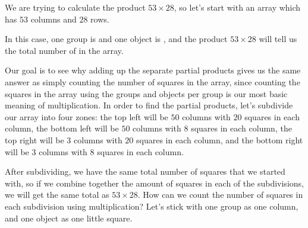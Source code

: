 \documentclass{ximera}
\begin{document}
\begin{explanation}
We are trying to calculate the product $53 \times 28$, so let's start with an array which has $53$ columns and $28$ rows.

\begin{image}
\end{image}
In this case, one group is  and one object is  , and the product $53 \times 28$ will tell us the total number of  in the array.

Our goal is to see why adding up the separate partial products gives us the same answer as simply counting the number of squares in the array, since counting the squares in the array using the groups and objects per group is our most basic meaning of multiplication. In order to find the partial products, let's subdivide our array into four zones: the top left will be $50$ columns with $20$ squares in each column, the bottom left will be $50$ columns with $8$ squares in each column, the top right will be $3$ columns with $20$ squares in each column, and the bottom right will be $3$ columns with $8$ squares in each column.

\begin{image}
\end{image}

After subdividing, we have the same total number of squares that we started with, so if we combine together the amount of squares in each of the subdivisions, we will get the same total as $53 \times 28$. How can we count the number of squares in each subdivision using multiplication? Let's stick with one group as one column, and one object as one little square.


\end{explanation}
\end{document}
